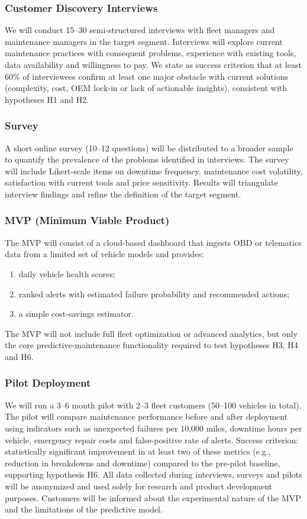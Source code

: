 \documentclass[11pt,a4paper]{article}
\begin{document}
\subsubsection{Customer Discovery Interviews}
\noindent We will conduct 15--30 semi-structured interviews with fleet managers and maintenance managers in the target segment. Interviews will explore current maintenance practices with consequent problems, experience with existing tools, data availability and willingness to pay. We state as success criterion that at least 60\% of interviewees confirm at least one major obstacle with current solutions (complexity, cost, OEM lock-in or lack of actionable insights), consistent with hypotheses H1 and H2.

\subsubsection{Survey}
\noindent A short online survey (10--12 questions) will be distributed to a broader sample to quantify the prevalence of the problems identified in interviews. The survey will include Likert-scale items on downtime frequency, maintenance cost volatility, satisfaction with current tools and price sensitivity. Results will triangulate interview findings and refine the definition of the target segment.

\subsubsection{MVP (Minimum Viable Product)}
\noindent The MVP will consist of a cloud-based dashboard that ingests OBD or telematics data from a limited set of vehicle models and provides:
\begin{enumerate}
    \item daily vehicle health scores;
    \item ranked alerts with estimated failure probability and recommended actions;
    \item a simple cost-savings estimator.
\end{enumerate}
\noindent The MVP will not include full fleet optimization or advanced analytics, but only the core predictive-maintenance functionality required to test hypotheses H3, H4 and H6.

\subsubsection{Pilot Deployment}
\noindent We will run a 3--6 month pilot with 2--3 fleet customers (50--100 vehicles in total). The pilot will compare maintenance performance before and after deployment using indicators such as unexpected failures per 10,000 miles, downtime hours per vehicle, emergency repair costs and false-positive rate of alerts. 
Success criterion: statistically significant improvement in at least two of these metrics (e.g., reduction in breakdowns and downtime) compared to the pre-pilot baseline, supporting hypothesis H6.
\noindent All data collected during interviews, surveys and pilots will be anonymized and used solely for research and product development purposes. Customers will be informed about the experimental nature of the MVP and the limitations of the predictive model.
\end{document}
